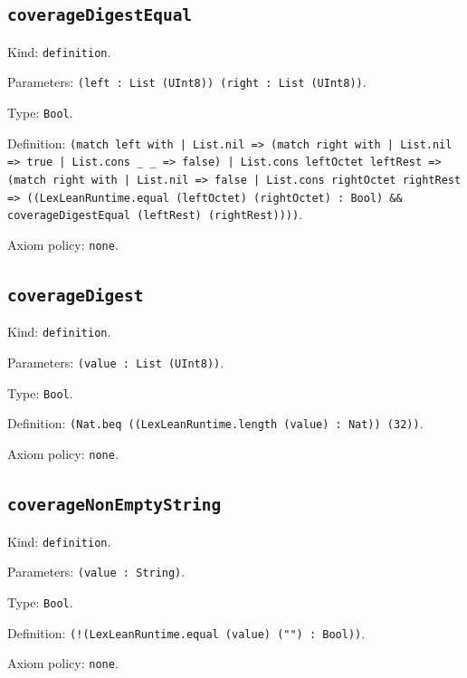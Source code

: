 \documentclass[11pt]{article}
\begin{document}
\subsection*{\texttt{coverageDigestEqual}}
\noindent Kind: \texttt{definition}.\par
\noindent Parameters: \texttt{(left : List (UInt8)) (right : List (UInt8))}.\par
\noindent Type: \texttt{Bool}.\par
\noindent Definition: \texttt{(match left with | List.nil => (match right with | List.nil => true | List.cons \_ \_ => false) | List.cons leftOctet leftRest => (match right with | List.nil => false | List.cons rightOctet rightRest => ((LexLeanRuntime.equal (leftOctet) (rightOctet) : Bool) \&\& coverageDigestEqual (leftRest) (rightRest))))}.\par
\noindent Axiom policy: \texttt{none}.\par
\subsection*{\texttt{coverageDigest}}
\noindent Kind: \texttt{definition}.\par
\noindent Parameters: \texttt{(value : List (UInt8))}.\par
\noindent Type: \texttt{Bool}.\par
\noindent Definition: \texttt{(Nat.beq ((LexLeanRuntime.length (value) : Nat)) (32))}.\par
\noindent Axiom policy: \texttt{none}.\par
\subsection*{\texttt{coverageNonEmptyString}}
\noindent Kind: \texttt{definition}.\par
\noindent Parameters: \texttt{(value : String)}.\par
\noindent Type: \texttt{Bool}.\par
\noindent Definition: \texttt{(!(LexLeanRuntime.equal (value) ("") : Bool))}.\par
\noindent Axiom policy: \texttt{none}.\par
\end{document}
